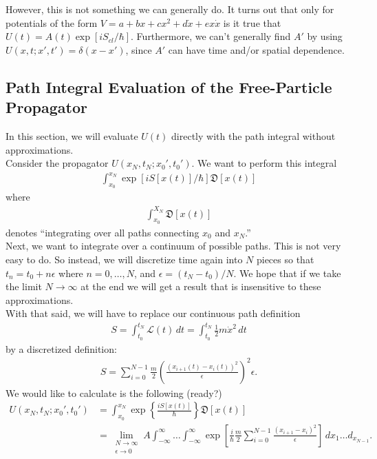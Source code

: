 \documentclass{book}
\theoremstyle{definition}
\newcommand{\lag}{\mathcal{L}}
\newcommand{\f}[2]{\frac{#1}{#2}}
\newcommand{\lp}{\left(}
\newcommand{\rp}{\right)}
\newcommand{\lb}{\left[}
\newcommand{\rb}{\right]}
\newcommand{\lc}{\left\{}
\newcommand{\rc}{\right\}}
\begin{document}
However, this is not something we can generally do. It turns out that only for potentials of the form $V = a + bx + cx^2 + d\dot{x} + ex\dot{x}$ is it true that $U(t) = A(t)\exp[iS_{cl}/\hbar]$. Furthermore, we can't generally find $A'$ by using $U(x,t;x',t') = \delta(x-x')$, since $A'$ can have time and/or spatial dependence. 




\subsection{Path Integral Evaluation of the Free-Particle Propagator}


In this section, we will evaluate $U(t)$ directly with the path integral without approximations. \\

Consider the propagator $U(x_N, t_N; x_0', t_0')$. We want to perform this integral
\begin{align}
\int_{x_0}^{x_N} \exp[iS[x(t)]/\hbar]\mathfrak{D}[x(t)]
\end{align} 
where
\begin{align}
\int_{x_0}^{X_N}\mathfrak{D}[x(t)]
\end{align}
denotes ``integrating over all paths connecting $x_0$ and $x_N$.'' \\

Next, we want to integrate over a continuum of possible paths. This is not very easy to do. So instead, we will discretize time again into $N$ pieces so that $t_n = t_0 + n\epsilon$ where $n = 0,\dots,N$, and $\epsilon = (t_N - t_0)/N$. We hope that if we take the limit $N \to \infty$ at the end we will get a result that is insensitive to these approximations.\\

With that said, we will have to replace our continuous path definition
\begin{align}
S = \int_{t_0}^{t_N} \lag(t)\,dt = \int_{t_0}^{t_N} \f{1}{2}m\dot{x}^2\,dt
\end{align}
by a discretized definition:
\begin{align}
S = \sum^{N-1}_{i=0} \f{m}{2}\lp  \f{(x_{i+1}(t) - x_i(t))^2}{\epsilon}\rp^2 \epsilon.
\end{align}
We would like to calculate is the following (ready?)
\begin{align}
U(x_N,t_N;x_0',t_0') &= \int_{x_0}^{x_N} \exp\lc \f{iS[x(t)]}{\hbar} \rc\mathfrak{D}[x(t)] \\ 
&= \lim_{\substack{N\to\infty \\ \epsilon\to 0}} A \int_{-\infty}^{\infty} \dots \int_{-\infty}^{\infty} \exp\lb \f{i}{\hbar}\f{m}{2}\sum_{i=0}^{N-1} \f{(x_{i+1} - x_i)^2}{\epsilon} \rb\, dx_1\dots d_{x_{N-1}}.
\end{align}
\end{document}
